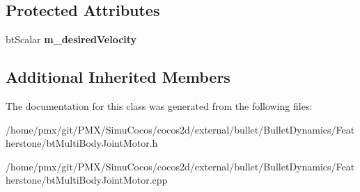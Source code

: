 \subsection*{Protected Attributes}
\begin{DoxyCompactItemize}
\item 
\mbox{\label{classbtMultiBodyJointMotor_a2f8f33635134f3289d769b90381701b0}} 
bt\+Scalar {\bfseries m\+\_\+desired\+Velocity}
\end{DoxyCompactItemize}
\subsection*{Additional Inherited Members}


The documentation for this class was generated from the following files\+:\begin{DoxyCompactItemize}
\item 
/home/pmx/git/\+P\+M\+X/\+Simu\+Cocos/cocos2d/external/bullet/\+Bullet\+Dynamics/\+Featherstone/bt\+Multi\+Body\+Joint\+Motor.\+h\item 
/home/pmx/git/\+P\+M\+X/\+Simu\+Cocos/cocos2d/external/bullet/\+Bullet\+Dynamics/\+Featherstone/bt\+Multi\+Body\+Joint\+Motor.\+cpp\end{DoxyCompactItemize}
